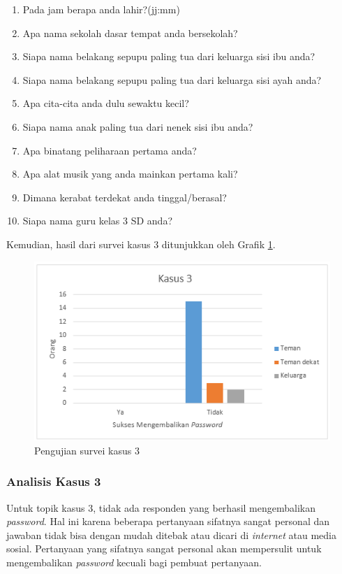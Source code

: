 \begin{enumerate}[itemsep=0mm]
	\item Pada jam berapa anda lahir?(jj:mm)
	\item Apa nama sekolah dasar tempat anda bersekolah?
	\item Siapa nama belakang sepupu paling tua dari keluarga sisi ibu anda?
	\item Siapa nama belakang sepupu paling tua dari keluarga sisi ayah anda?
	\item Apa cita-cita anda dulu sewaktu kecil?
	\item Siapa nama anak paling tua dari nenek sisi ibu anda?
	\item Apa binatang peliharaan pertama anda?
	\item Apa alat musik yang anda mainkan pertama kali?
	\item Dimana kerabat terdekat anda tinggal/berasal?
	\item Siapa nama guru kelas 3 SD anda?
\end{enumerate}

Kemudian, hasil dari survei kasus 3 ditunjukkan oleh Grafik \ref{fig:kasus3}.

\begin{figure}[H]
	\includegraphics[scale=0.8]{Gambar/kasus3}
	\centering
	\caption{Pengujian survei kasus 3}\label{fig:kasus3}
\end{figure}

\subsubsection{Analisis Kasus 3}

Untuk topik kasus 3, tidak ada responden yang berhasil mengembalikan \textit{password}. Hal ini karena beberapa pertanyaan sifatnya sangat personal dan jawaban tidak bisa dengan mudah ditebak atau dicari di \textit{internet} atau media sosial. Pertanyaan yang sifatnya sangat personal akan mempersulit untuk mengembalikan \textit{password} kecuali bagi pembuat pertanyaan.

